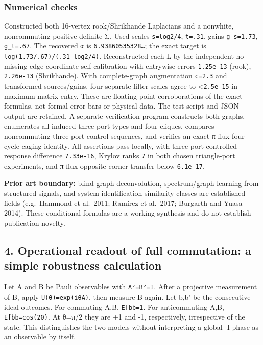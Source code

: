 \documentclass[
  10pt,
  a4paper,
]{article}
\begin{document}
\subsubsection{Numerical checks}\label{numerical-checks}

Constructed both 16-vertex rook/Shrikhande Laplacians and a nonwhite, noncommuting positive-definite Σ. Used scales \texttt{s=log2/4}, \texttt{t=.31}, gains \texttt{g\_s=1.73}, \texttt{g\_t=.67}. The recovered \texttt{α} is \texttt{6.93860535328…}; the exact target is \texttt{log(1.73/.67)/(.31-log2/4)}. Reconstructed each L by the independent no-missing-edge-coordinate self-calibration with entrywise errors \texttt{1.25e-13} (rook), \texttt{2.26e-13} (Shrikhande). With complete-graph augmentation \texttt{c=2.3} and transformed sources/gains, four separate filter scales agree to \textless{}\texttt{2.5e-15} in maximum matrix entry. These are floating-point corroborations of the exact formulas, not formal error bars or physical data. The test script and JSON output are retained. A separate verification program constructs both graphs, enumerates all induced three-port types and four-cliques, compares noncommuting three-port control sequences, and verifies an exact π-flux four-cycle caging identity. All assertions pass locally, with three-port controlled response difference \texttt{7.33e-16}, Krylov ranks \texttt{7} in both chosen triangle-port experiments, and π-flux opposite-corner transfer below \texttt{6.1e-17}.

\textbf{Prior art boundary:} blind graph deconvolution, spectrum/graph learning from structured signals, and system-identification similarity classes are established fields (e.g.~Hammond et al.~2011; Ramírez et al.~2017; Burgarth and Yuasa 2014). These conditional formulas are a working synthesis and do not establish publication novelty.

\subsection{4. Operational readout of full commutation: a simple robustness calculation}\label{operational-readout-of-full-commutation-a-simple-robustness-calculation}

Let A and B be Pauli observables with \texttt{A²=B²=I}. After a projective measurement of B, apply \texttt{U(θ)=exp(iθA)}, then measure B again. Let b,b' be the consecutive ideal outcomes. For commuting A,B, \texttt{E{[}bb\textquotesingle{}{]}=1}. For anticommuting A,B, \texttt{E{[}bb\textquotesingle{}{]}=cos(2θ)}. At θ=π/2 they are +1 and -1, respectively, irrespective of the state. This distinguishes the two models without interpreting a global -I phase as an observable by itself.
\end{document}
